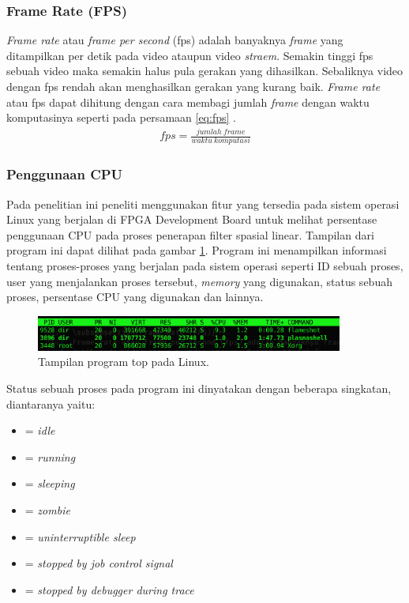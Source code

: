 \subsubsection{Frame Rate (FPS)}
\textit{Frame rate} atau \textit{frame per second} (fps) adalah banyaknya \textit{frame} yang ditampilkan per detik pada video ataupun video \textit{straem}. Semakin tinggi fps sebuah video maka semakin halus pula gerakan yang dihasilkan. Sebaliknya video dengan fps rendah akan menghasilkan gerakan yang kurang baik. \textit{Frame rate} atau fps dapat dihitung dengan cara membagi jumlah \textit{frame} dengan waktu komputasinya seperti pada persamaan \ref{eq:fps} \cite{pdf:pavan}.
\begin{equation}
    \label{eq:fps}
    \begin{split}
fps = \frac{jumlah\ frame}{waktu\ komputasi}
    \end{split}
\end{equation}

\subsubsection{Penggunaan CPU}
Pada penelitian ini peneliti menggunakan fitur yang tersedia pada sistem operasi Linux yang berjalan di FPGA Development Board untuk melihat persentase penggunaan CPU pada proses penerapan filter spasial linear. Tampilan dari program ini dapat dilihat pada gambar \ref{fig:top}. Program ini menampilkan informasi tentang proses-proses yang berjalan pada sistem operasi seperti ID sebuah proses, user yang menjalankan proses tersebut, \textit{memory} yang digunakan, status sebuah proses, persentase CPU yang digunakan dan lainnya.
\begin{figure}[H]
    \includegraphics[width=0.9\textwidth, center]{images/programs/top.png}
    \caption{Tampilan program top pada Linux.}
    \label{fig:top}
\end{figure}
Status sebuah proses pada program ini dinyatakan dengan beberapa singkatan, diantaranya yaitu:
\begin{itemize}[noitemsep, topsep=0pt]
    \item[]{ = \textit{idle}}
    \item[]{ = \textit{running}}
    \item[]{ = \textit{sleeping}}
    \item[]{ = \textit{zombie}}
    \item[]{ = \textit{uninterruptible sleep}}
    \item[]{ = \textit{stopped by job control signal}}
    \item[]{ = \textit{stopped by debugger during trace}}
  \end{itemize}


